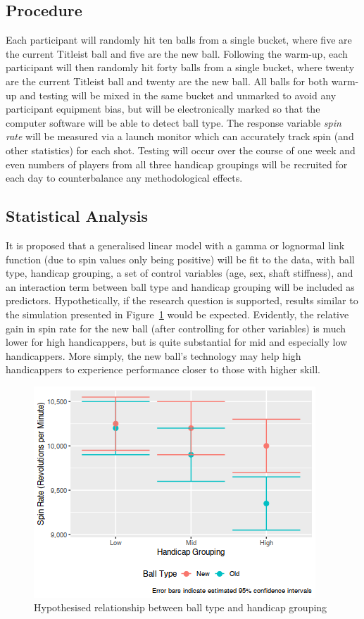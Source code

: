 \documentclass{article}
\begin{document}
\subsection*{Procedure}

Each participant will randomly hit ten balls from a single bucket, where five are the current Titleist ball and five are the new ball. 
Following the warm-up, each participant will then randomly hit forty balls from a single bucket, where twenty are the current Titleist ball and twenty are the new ball.
All balls for both warm-up and testing will be mixed in the same bucket and unmarked to avoid any participant equipment bias, but will be electronically marked so that the computer software will be able to detect ball type. 
The response variable \textit{spin rate} will be measured via a launch monitor which can accurately track spin (and other statistics) for each shot. 
Testing will occur over the course of one week and even numbers of players from all three handicap groupings will be recruited for each day to counterbalance any methodological effects.

\subsection*{Statistical Analysis}

It is proposed that a generalised linear model with a gamma or lognormal link function (due to spin values only being positive) will be fit to the data, with ball type, handicap grouping, a set of control variables (age, sex, shaft stiffness), and an interaction term between ball type and handicap grouping will be included as predictors. 
Hypothetically, if the research question is supported, results similar to the simulation presented in Figure~\ref{fig:expectations} would be expected.
Evidently, the relative gain in spin rate for the new ball (after controlling for other variables) is much lower for high handicappers, but is quite substantial for mid and especially low handicappers. 
More simply, the new ball's technology may help high handicappers to experience performance closer to those with higher skill.

\begin{figure}[h]
    \centering
    \includegraphics[max width=\linewidth, scale=0.53]{expectations}
    \caption{\label{fig:expectations}Hypothesised relationship between ball type and handicap grouping}
\end{figure}
\end{document}
